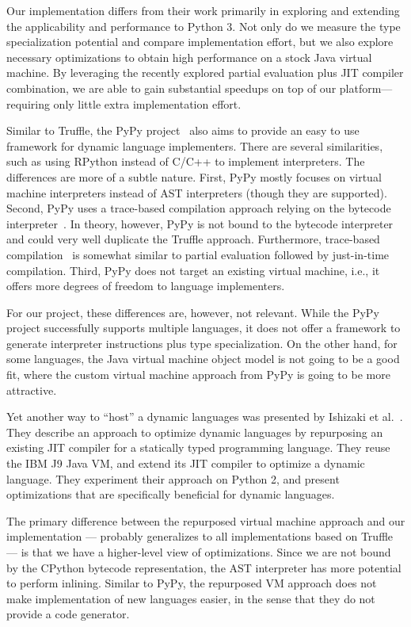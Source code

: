 Our implementation differs from their work primarily in exploring and extending the applicability and performance to Python 3.
Not only do we measure the type specialization potential and compare implementation effort, but we also explore necessary optimizations to obtain high performance on a stock Java virtual machine.
By leveraging the recently explored partial evaluation plus JIT compiler combination, 
we are able to gain substantial speedups on top of our platform---requiring only little extra implementation effort.

Similar to Truffle, the PyPy project~\cite{Rigo2006} also aims to provide an easy to use framework for dynamic language implementers.
There are several similarities, such as using RPython instead of C/C++ to implement interpreters. 
The differences are more of a subtle nature.
First, PyPy mostly  focuses on virtual machine interpreters instead of AST interpreters (though they are supported).
Second, PyPy uses a trace-based compilation approach relying on the bytecode interpreter~\cite{bolz.etal09}.
In theory, however, PyPy is not bound to the bytecode interpreter and could very well duplicate the Truffle approach.
Furthermore, trace-based compilation~\cite{gal.etal+09,chang.etal+09} is somewhat similar to partial evaluation followed by just-in-time compilation.
Third, PyPy does not target an existing virtual machine, i.e., it offers more degrees of freedom to language implementers.

For our project, these differences are, however, not relevant.
While the PyPy project successfully supports multiple languages, it does not offer a framework to generate interpreter instructions plus type specialization.
On the other hand, for some languages, the Java virtual machine object model is not going to be a good fit, where the custom virtual machine approach from PyPy is going to be more attractive.

Yet another way to ``host'' a dynamic languages was presented by Ishizaki et al.~\cite{Ishizaki.etal+12}.
They describe an approach to optimize dynamic languages by repurposing an existing JIT compiler for a statically typed programming language.
They reuse the IBM J9 Java VM, and extend its JIT compiler to optimize a dynamic language.
They experiment their approach on Python 2, and present optimizations that are specifically beneficial for dynamic languages.

The primary difference between the repurposed virtual machine approach and our implementation --- probably generalizes to all implementations based on Truffle --- is that we have a higher-level view of optimizations.
Since we are not bound by the CPython bytecode representation, the AST interpreter has more potential to perform inlining.
Similar to PyPy, the repurposed VM approach does not make implementation of new languages easier, in the sense that they do not provide a code generator.

